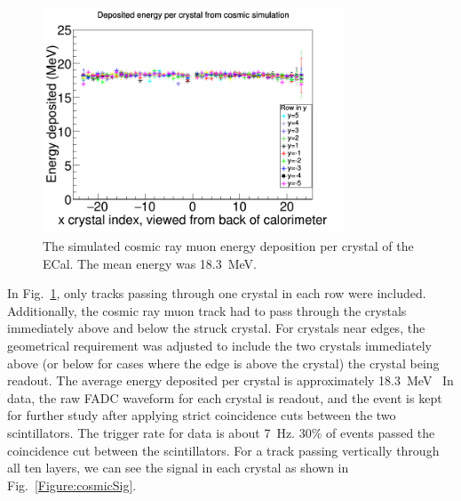 \begin{figure}[htb]
  \centering
      \includegraphics[width=0.8\textwidth]{pics/performance/cosmicEdep.png}
  \caption[Simulation of energy deposited per ECal module from cosmic rays]{The simulated cosmic ray muon energy deposition per crystal of the ECal. The mean energy was 18.3~MeV.}
  \label{Figure:cosmicEdep}
\end{figure}

In Fig.~\ref{Figure:cosmicEdep}, only tracks passing through one crystal in each row were included. Additionally, the cosmic ray muon track had to pass through the crystals immediately above and below the struck crystal. For crystals near edges, the geometrical requirement was adjusted to include the two crystals immediately above (or below for cases where the edge is above the crystal) the crystal being readout. The average energy deposited per crystal is approximately 18.3~MeV~\cite{Agashe:2014kda}
In data, the raw FADC waveform for each crystal is readout, and the event is kept for further study after applying strict coincidence cuts between the two scintillators. The trigger rate for data is about 7~Hz. 30$\%$ of events passed the coincidence cut between the scintillators. For a track passing vertically through all ten layers, we can see the signal in each crystal as shown in Fig.~\ref{Figure:cosmicSig}.

